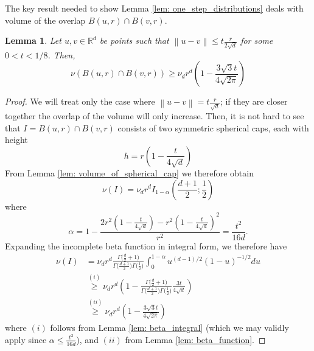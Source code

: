 \documentclass{article}
\newcommand{\Reals}{\mathbb{R}}
\newcommand{\Rd}{\Reals^d}
\newcommand{\norm}[1]{\left\lVert#1\right\rVert}
\newcommand{\1}{\mathbf{1}}
\theoremstyle{aldenthm}
\newtheorem{lemma}{Lemma}
\theoremstyle{aldenrmrk}
\begin{document}
The key result needed to show Lemma \ref{lem: one_step_distributions} deals with volume of the overlap $B(u,r) \cap B(v,r)$. 

\begin{lemma}
	\label{lem: overlap_balls_1}
	Let $u,v \in \Rd$ be points such that $\norm{u - v} \leq t\frac{r}{2\sqrt{d}}$ for some $0 < t < 1/8$. Then,
	\begin{equation*}
	\nu(B(u,r) \cap B(v,r)) \geq \nu_d r^d \left(1 - \frac{3 \sqrt{3} t}{4\sqrt{2\pi}} \right)
	\end{equation*}
\end{lemma}
\begin{proof}
	We will treat only the case where $\norm{u - v} = t\frac{r}{\sqrt{d}}$; if they are closer together the overlap of the volume will only increase. Then, it is not hard to see that $I = B(u,r) \cap B(v,r)$ consists of two symmetric spherical caps, each with height
	\begin{equation*}
	h = r\left(1 - \frac{t}{4\sqrt{d}}\right)
	\end{equation*} 
	From Lemma \ref{lem: volume_of_spherical_cap} we therefore obtain
	\begin{equation*}
	\nu(I) = \nu_d r^d I_{1 - \alpha}(\frac{d + 1}{2}; \frac{1}{2})
	\end{equation*}
	where
	\begin{equation*}
	\alpha = 1 - \frac{2r^2(1 - \frac{t}{4 \sqrt{d}}) - r^2(1 - \frac{t}{4 \sqrt{d}})^2}{r^2} = \frac{t^2}{16d}.
	\end{equation*}
	Expanding the incomplete beta function in integral form, we therefore have
	\begin{align*}
	\nu(I) & = \nu_d r^d \frac{\Gamma\bigl(\frac{d}{2}+ 1\bigr)}{\Gamma\bigl(\frac{d + 1}{2}\bigr) \Gamma\bigl(\frac{1}{2}\bigr)} \int_{0}^{1 - \alpha}u^{(d-1)/2}(1 - u)^{-1/2}du \\
	& \overset{(i)}{\geq} \nu_d r^d \left(1 - \frac{\Gamma\bigl(\frac{d}{2}+ 1\bigr)}{\Gamma\bigl(\frac{d + 1}{2}\bigr) \Gamma\bigl(\frac{1}{2}\bigr)} \frac{3 t}{4\sqrt{d}} \right) \\
	& \overset{(ii)}{\geq} \nu_d r^d \left(1 -  \frac{3 \sqrt{3} t}{4\sqrt{2\pi}} \right)
	\end{align*}
	where $(i)$ follows from Lemma \ref{lem: beta_integral} (which we may validly apply since $\alpha \leq \frac{t^2}{16d}$), and $(ii)$ from Lemma \ref{lem: beta_function}.
\end{proof}
\end{document}
